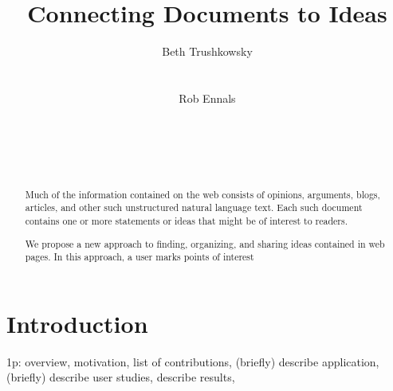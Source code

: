 \documentclass{sig-alt-release2}
\newcommand{\idea}[1]{{\color{blue} IDEA: #1}\\}
\begin{document}
%
\title{Connecting Documents to Ideas}


\author{
\alignauthor Beth Trushkowsky\\
       \\
       \\
\alignauthor Rob Ennals\\
       \\
       \\
       \\
       \\
}

\sloppy 

\maketitle

\begin{abstract}

Much of the information contained on the web consists of opinions, arguments, blogs, articles, and other such unstructured natural language text. Each such document contains one or more statements or ideas that might be of interest to readers.

We propose a new approach to finding, organizing, and sharing ideas contained in web pages. In this approach, a user marks points of interest 

\end{abstract}

\section{Introduction}
1p:  
overview, 
motivation,
list of contributions,
(briefly) describe application,
(briefly) describe user studies,
describe results,

% 
% 
% 
% 

\end{document}
